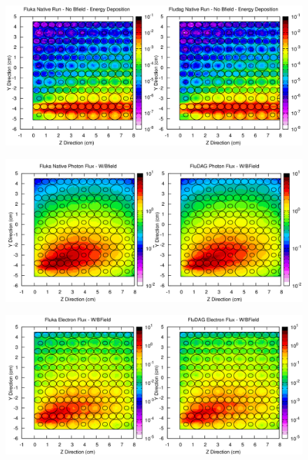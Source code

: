 \begin{figure}[ht!]
 \begin{centering}
 \centering
 \includegraphics[width=0.9\paperwidth,angle=90]{../figs/magnsph_energy_nob.png}
 \caption{}
 \label{fig:magnsph_energy_nob}
 \end{centering}
\end{figure}

\begin{figure}[ht!]
 \begin{centering}
 \centering
 \includegraphics[width=0.9\paperwidth,angle=90]{../figs/magnsph_photon_b.png}
 \caption{}
 \label{fig:magnsph_photon_b}
 \end{centering}
\end{figure}

\begin{figure}[ht!]
 \begin{centering}
 \centering
 \includegraphics[width=0.9\paperwidth,angle=90]{../figs/magnsph_electron_b.png}
 \caption{}
 \label{fig:magnsph_electron_b}
 \end{centering}
\end{figure}

